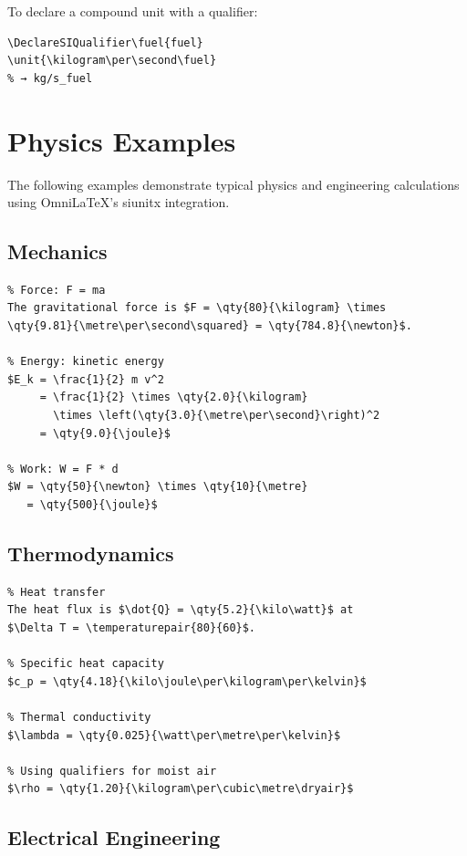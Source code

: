 To declare a compound unit with a qualifier:

\begin{verbatim}
\DeclareSIQualifier\fuel{fuel}
\unit{\kilogram\per\second\fuel}
% → kg/s_fuel
\end{verbatim}

\section{Physics Examples}

The following examples demonstrate typical physics and engineering
calculations using OmniLaTeX's siunitx integration.

\subsection{Mechanics}

\begin{verbatim}
% Force: F = ma
The gravitational force is $F = \qty{80}{\kilogram} \times
\qty{9.81}{\metre\per\second\squared} = \qty{784.8}{\newton}$.

% Energy: kinetic energy
$E_k = \frac{1}{2} m v^2
     = \frac{1}{2} \times \qty{2.0}{\kilogram}
       \times \left(\qty{3.0}{\metre\per\second}\right)^2
     = \qty{9.0}{\joule}$

% Work: W = F * d
$W = \qty{50}{\newton} \times \qty{10}{\metre}
   = \qty{500}{\joule}$
\end{verbatim}

\subsection{Thermodynamics}

\begin{verbatim}
% Heat transfer
The heat flux is $\dot{Q} = \qty{5.2}{\kilo\watt}$ at
$\Delta T = \temperaturepair{80}{60}$.

% Specific heat capacity
$c_p = \qty{4.18}{\kilo\joule\per\kilogram\per\kelvin}$

% Thermal conductivity
$\lambda = \qty{0.025}{\watt\per\metre\per\kelvin}$

% Using qualifiers for moist air
$\rho = \qty{1.20}{\kilogram\per\cubic\metre\dryair}$
\end{verbatim}

\subsection{Electrical Engineering}

